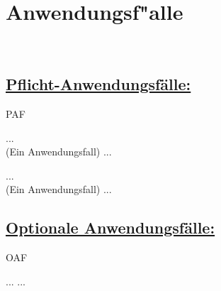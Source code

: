%
%


\section{Anwendungsf{"a}lle}
\label{NU:AF}~\\



\subsection*{\underline{Pflicht-Anwendungsfälle:}}

\begin{ids}{\gls{PAF}}

	\id[ 1] ... \hfill\\
	
	(Ein Anwendungsfall) ...
	
	\id[10] ... \hfill\\
	
	(Ein Anwendungsfall) ...

\end{ids}


%
%
\clearpage

\subsection*{\underline{Optionale Anwendungsfälle:}}

\begin{ids}{\gls{OAF}}

	\id[ 1] ...
	\id[10] ...

\end{ids}